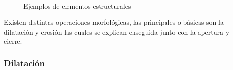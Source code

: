 \begin{figure}
\centering
{} %
\qquad
{} 
\\
\caption{Ejemplos de elementos estructurales} \label{fig:EX}
\end{figure} 

Existen distintas operaciones morfológicas, las principales o básicas son la dilatación y erosión las cuales se explican enseguida junto con la apertura y cierre. 
 
\subsubsection{Dilatación}\label{sssec:Dilatation}

